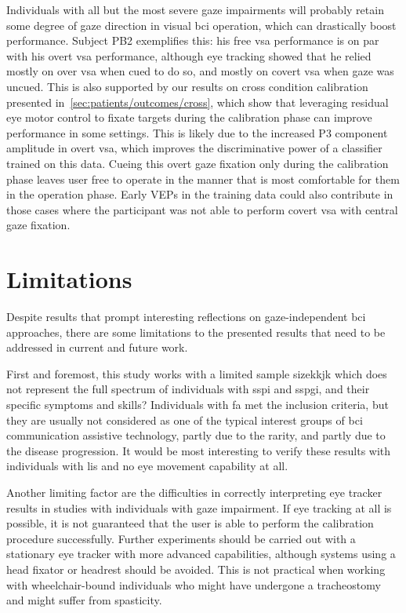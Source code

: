 Individuals with all but the most severe gaze impairments will probably retain
some degree of gaze direction in visual \ac{bci} operation, which can
drastically boost performance.
Subject PB2 exemplifies this: his free \ac{vsa} performance is on par with his
overt \ac{vsa} performance, although eye tracking showed that he relied mostly
on over \ac{vsa} when cued to do so, and mostly on covert \ac{vsa} when
gaze was uncued.
This is also supported by our results on cross condition calibration presented
in~\autoref{sec:patients/outcomes/cross}, which show that leveraging residual
eye motor control to fixate targets during the calibration phase can improve
performance in some settings.
This is likely due to the increased P3 component amplitude in overt \ac{vsa},
which improves the discriminative power of a classifier trained on this data.
Cueing this overt gaze fixation only during the calibration phase leaves user
free to operate in the manner that is most comfortable for them in  the
operation phase.
Early VEPs in the training data could also contribute in those cases where the participant was not
able to perform covert \ac{vsa} with central gaze fixation.


\section{Limitations}

Despite results that prompt interesting reflections on gaze-independent \ac{bci} approaches,
there are some limitations to the presented results that need to be
addressed in current and future work.

First and foremost, this study works with a limited sample sizekkjk which
does not represent the full spectrum of individuals with \ac{sspi} and
\ac{sspgi}, and their specific symptoms and skills?
Individuals with \ac{fa} met the inclusion criteria, but they are usually not
considered as one of the typical interest groups of \ac{bci} communication assistive
technology, partly due to the rarity, and partly due to the disease
progression.
It would be most interesting to verify these results with individuals with
\ac{lis} and no eye movement capability at all.

Another limiting factor are the difficulties in correctly interpreting eye
tracker results in studies with individuals with gaze impairment.
If eye tracking at all is possible, it is not guaranteed that the user is able
to perform the calibration procedure successfully.
Further experiments should be carried out with a stationary eye tracker with
more advanced capabilities, although systems using a head fixator or headrest
should be avoided.
This is not practical when working with
wheelchair-bound individuals who might have undergone a tracheostomy and might
suffer from spasticity.

